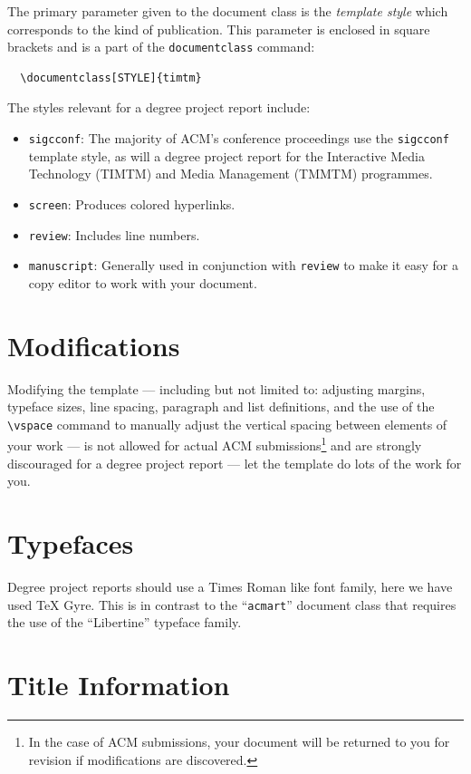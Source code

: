 \documentclass[screen, sigcconf]{timtm}
\begin{document}
The primary parameter given to the document class is
the {\itshape template style} which corresponds to the kind of publication. This parameter is enclosed in square
brackets and is a part of the {\verb|documentclass|} command:
\begin{verbatim}
  \documentclass[STYLE]{timtm}
\end{verbatim}

The styles relevant for a degree project report include:
\begin{itemize}
\item {\verb|sigcconf|}: The majority of ACM's conference proceedings use the {\verb|sigcconf|} template style, as will a degree project report for the Interactive Media Technology (TIMTM) and Media Management (TMMTM) programmes.
\item {\verb|screen|}: Produces colored hyperlinks.
\item {\verb|review|}: Includes line numbers.
\item {\verb|manuscript|}: Generally used in conjunction with \verb|review| to make it easy for a copy editor to work with your document.
\end{itemize}

\section{Modifications}

Modifying the template --- including but not limited to: adjusting
margins, typeface sizes, line spacing, paragraph and list definitions,
and the use of the \verb|\vspace| command to manually adjust the
vertical spacing between elements of your work --- is not allowed for actual ACM submissions\footnote{In the case of ACM submissions, your document will be returned to you for revision if modifications are discovered.} and are strongly discouraged for a degree project report --- let the template do lots of the work for you.

\section{Typefaces}

Degree project reports should use a Times Roman like font family, here we have used TeX Gyre. This is in contrast to the ``\verb|acmart|'' document class that requires the use of the ``Libertine'' typeface family.

\section{Title Information}
\end{document}
